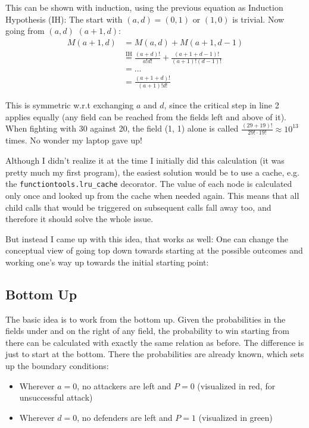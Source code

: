 \documentclass[11pt,a4paper]{article}
\begin{document}
    This can be shown with induction, using the previous equation as Induction Hypothesis (IH):
    The start with $(a, d) = (0, 1)$ or $(1, 0)$ is trivial.
    Now going from $(a, d)$ $(a+1, d)$:
    \[ \begin{aligned}
           M(a+1, d) & = M(a, d) + M(a+1, d-1) \\ & \overset{\mathrm{IH}}{=} \frac{(a + d)!}{a! d!} + \frac{(a+1 + d-1)!}{(a+1)! (d-1)!} \\ & = \ldots \\ & = \frac{(a+1 + d)!}{(a+1)! d!}
    \end{aligned} \]

    This is symmetric w.r.t exchanging $a$ and $d$, since the critical step in line 2 applies equally (any field can be reached from the fields left and above of it).
    When fighting with 30 against 20, the field (1, 1) alone is called $\frac{(29 + 19)!}{29! \cdot 19!} \approx 10^{13}$ times.
    No wonder my laptop gave up!

    Although I didn't realize it at the time I initially did this calculation (it was pretty much my first program), the easiest solution would be to use a cache, e.g. the \texttt{functiontools.lru\_cache} decorator.
    The value of each node is calculated only once and looked up from the cache when needed again.
    This means that all child calls that would be triggered on subsequent calls fall away too, and therefore it should solve the whole issue.

    But instead I came up with this idea, that works as well:
    One can change the conceptual view of going top down towards starting at the possible outcomes and working one's way up towards the initial starting point:

    \subsection{Bottom Up}
    The basic idea is to work from the bottom up.
    Given the probabilities in the fields under and on the right of any field, the probability to win starting from there can be calculated with exactly the same relation as before.
    The difference is just to start at the bottom.
    There the probabilities are already known, which sets up the boundary conditions:

    \begin{itemize}
        \item Wherever $a=0$, no attackers are left and $P=0$ (visualized in red, for unsuccessful attack)
        \item Wherever $d=0$, no defenders are left and $P=1$ (visualized in green)
    \end{itemize}
\end{document}
